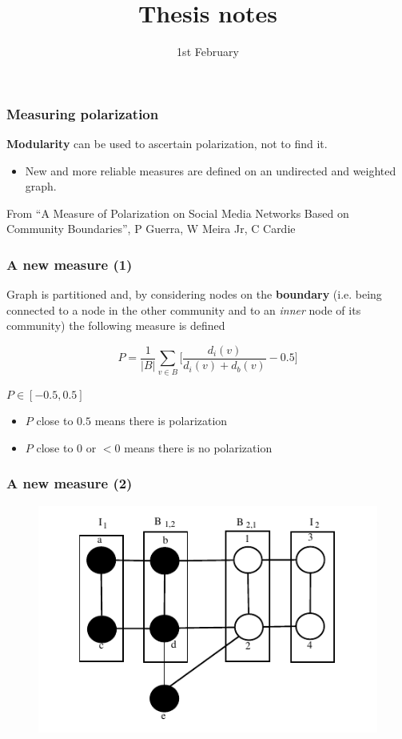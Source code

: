 \documentclass{beamer}
\begin{document}
    \title{Thesis notes}
    \date{1st February}
    \frame{\titlepage}

    \begin{frame}[c]
        \frametitle{Measuring polarization}
        \textbf{Modularity} can be used to ascertain polarization, not to find it.
        \begin{itemize}
            \item New and more reliable measures are defined on an undirected and weighted graph.
        \end{itemize}

        \bigskip

        From “A Measure of Polarization on Social Media Networks Based on
        Community Boundaries”, P Guerra, W Meira Jr, C Cardie

    \end{frame}

    \begin{frame}[c]
        \frametitle{A new measure (1)}
        Graph is partitioned and, by considering nodes on the \textbf{boundary}
        (i.e. being connected to a node in the other community and to an
        \textit{inner} node of its community) the following
        measure is defined         

        \begin{equation}
            P = \frac{1}{|B|} \sum^{}_{v \in B} \bigg[ \frac{d_i(v)}{d_i(v) +
            d_b(v)} - 0.5 \bigg]
        \end{equation}

        $P \in [-0.5, 0.5]$
        \begin{itemize}
            \item $P$ close to $0.5$ means there is polarization
            \item $P$ close to $0$ or $< 0$ means there is no polarization
        \end{itemize}
    \end{frame}

    \begin{frame}[c]
        \frametitle{A new measure (2)}
        \begin{figure}[htpb]
            \centering
            \includegraphics[width=0.8\linewidth]{img/bound_simple.png}
            \label{fig:img/bound_simple}
        \end{figure}
    \end{frame}
\end{document}
